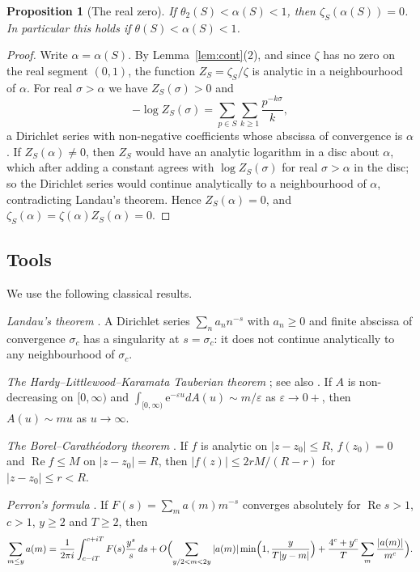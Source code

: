 \documentclass[11pt]{amsart}
\newtheorem{proposition}[lemma]{Proposition}
\theoremstyle{remark}
\numberwithin{equation}{section}
\newcommand{\eps}{\varepsilon}
\newcommand{\e}{\mathrm{e}}
\DeclareMathOperator{\re}{Re}
\begin{document}
\begin{proposition}[The real zero]\label{prop:realzero}
If $\theta_2(S)<\alpha(S)<1$, then $\zeta_S(\alpha(S))=0$. In particular this holds if $\theta(S)<\alpha(S)<1$.
\end{proposition}

\begin{proof}
Write $\alpha=\alpha(S)$. By Lemma~\ref{lem:cont}(2), and since $\zeta$ has no zero on the real segment $(0,1)$, the function $Z_S=\zeta_S/\zeta$ is analytic in a neighbourhood of $\alpha$. For real $\sigma>\alpha$ we have $Z_S(\sigma)>0$ and
\[
-\log Z_S(\sigma)=\sum_{p\in S}\sum_{k\ge1}\frac{p^{-k\sigma}}{k},
\]
a Dirichlet series with non-negative coefficients whose abscissa of convergence is $\alpha$. If $Z_S(\alpha)\ne0$, then $Z_S$ would have an analytic logarithm in a disc about $\alpha$, which after adding a constant agrees with $\log Z_S(\sigma)$ for real $\sigma>\alpha$ in the disc; so the Dirichlet series would continue analytically to a neighbourhood of $\alpha$, contradicting Landau's theorem. Hence $Z_S(\alpha)=0$, and $\zeta_S(\alpha)=\zeta(\alpha)Z_S(\alpha)=0$.
\end{proof}

\subsection{Tools}
We use the following classical results.

\smallskip\noindent\emph{Landau's theorem} \cite[Theorem~1.7]{MVbook}. A Dirichlet series $\sum_na_nn^{-s}$ with $a_n\ge0$ and finite abscissa of convergence $\sigma_c$ has a singularity at $s=\sigma_c$: it does not continue analytically to any neighbourhood of $\sigma_c$.

\smallskip\noindent\emph{The Hardy--Littlewood--Karamata Tauberian theorem} \cite[Theorem~1.7.1]{BGT}; see also \cite{Korevaar}. If $A$ is non-decreasing on $[0,\infty)$ and $\int_{[0,\infty)}\e^{-\eps u}dA(u)\sim m/\eps$ as $\eps\to0+$, then $A(u)\sim mu$ as $u\to\infty$.

\smallskip\noindent\emph{The Borel--Carath\'eodory theorem} \cite[\S5.5]{TitFunctions}. If $f$ is analytic on $|z-z_0|\le R$, $f(z_0)=0$ and $\re f\le M$ on $|z-z_0|=R$, then $|f(z)|\le 2rM/(R-r)$ for $|z-z_0|\le r<R$.

\smallskip\noindent\emph{Perron's formula} \cite[Corollary~5.3]{MVbook}. If $F(s)=\sum_ma(m)m^{-s}$ converges absolutely for $\re s>1$, $c>1$, $y\ge2$ and $T\ge2$, then
\[
\sum_{m\le y}a(m)=\frac1{2\pi i}\int_{c-iT}^{c+iT}F(s)\frac{y^s}{s}\,ds+O\Bigl(\sum_{y/2<m<2y}|a(m)|\min\Bigl(1,\frac{y}{T|y-m|}\Bigr)+\frac{4^c+y^c}{T}\sum_m\frac{|a(m)|}{m^c}\Bigr).
\]
\end{document}

